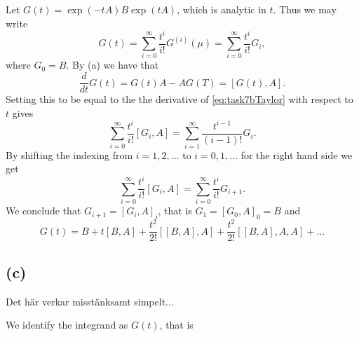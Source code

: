 Let $G(t) = \exp(-tA)B\exp(tA)$, which is analytic in $t$. Thus we may write
\begin{equation}
  \label{eq:task7bTaylor}
G(t) = \sum\limits_{i = 0}^{\infty}\frac{t^{i}}{i!} G^{(i)}(\mu)=\sum\limits_{i = 0}^{\infty}\frac{t^{i}}{i!} G_{i},
\end{equation}
where $G_{0} = B$.
By (a) we have that
\begin{equation}
  \frac{d}{dt}G(t) = G(t)A-AG(T) = [G(t),A].
\end{equation}
Setting this to be equal to the the derivative of \eqref{eq:task7bTaylor} with respect to $t$ gives
\begin{equation}
\sum\limits_{i = 0}^{\infty}\frac{t^{i}}{i!} [G_{i},A] = \sum\limits_{i = 1}^{\infty}\frac{t^{i-1}}{(i-1)!} G_{i}.
\end{equation}
By shifting the indexing from $i = 1,2,\ldots $ to $i = 0,1,\ldots$ for the right hand side we get
\begin{equation}
\sum\limits_{i = 0}^{\infty}\frac{t^{i}}{i!} [G_{i},A] = \sum\limits_{i = 0}^{\infty}\frac{t^{i}}{i!} G_{i+1}.
\end{equation}
We conclude that $G_{i+1} = [G_{i},A]_{i}$, that is $G_{1} = [G_{0},A]_{0} = B$ and
\begin{equation}
  G(t) = B + t[B,A]+\frac{t^{2}}{2!}[[B,A],A]+\frac{t^{2}}{2!}[[B,A],A,A]+\ldots
\end{equation}

\subsection*{(c)}
Det här verkar misstänksamt simpelt...

We identify the integrand as $G(t)$, that is

